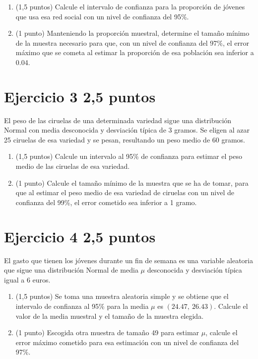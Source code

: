 \documentclass[11pt]{article}
\begin{document}
\begin{enumerate}[label=(\alph*)]
  \item (1,5 puntos)  Calcule el intervalo de confianza para la proporción de jóvenes que usa esa red social con un nivel de confianza del 95\%.

  

  \item (1 punto)  Manteniendo la proporción muestral, determine el tamaño mínimo de la muestra necesario para que, con un nivel de confianza del 97\%, el error máximo que se cometa al estimar la proporción de esa población sea inferior a 0.04.

  

\end{enumerate}



\clearpage
\section*{Ejercicio 3 \hfill 2,5 puntos}
 El peso de las ciruelas de una determinada variedad sigue una distribución Normal con media desconocida y desviación típica de 3 gramos. Se eligen al azar 25 ciruelas de esa variedad y se pesan, resultando un peso medio de 60 gramos.

\begin{enumerate}[label=(\alph*)]

  \item (1,5 puntos)  Calcule un intervalo al 95\% de confianza para estimar el peso medio de las ciruelas de esa variedad.

  

  \item (1 punto)  Calcule el tamaño mínimo de la muestra que se ha de tomar, para que al estimar el peso medio de esa variedad de ciruelas con un nivel de confianza del 99\%, el error cometido sea inferior a 1 gramo.

  

\end{enumerate}


\section*{Ejercicio 4 \hfill 2,5 puntos}
 El gasto que tienen los jóvenes durante un fin de semana es una variable aleatoria que sigue una distribución Normal de media \( \mu \) desconocida y desviación típica igual a 6 euros.

\begin{enumerate}[label=(\alph*)]

  \item (1,5 puntos)  Se toma una muestra aleatoria simple y se obtiene que el intervalo de confianza al 95\% para la media \( \mu \) es \( (24.47,\ 26.43) \). Calcule el valor de la media muestral y el tamaño de la muestra elegida.

  

  \item (1 punto)  Escogida otra muestra de tamaño 49 para estimar \( \mu \), calcule el error máximo cometido para esa estimación con un nivel de confianza del 97\%.

  

\end{enumerate}
\end{document}
